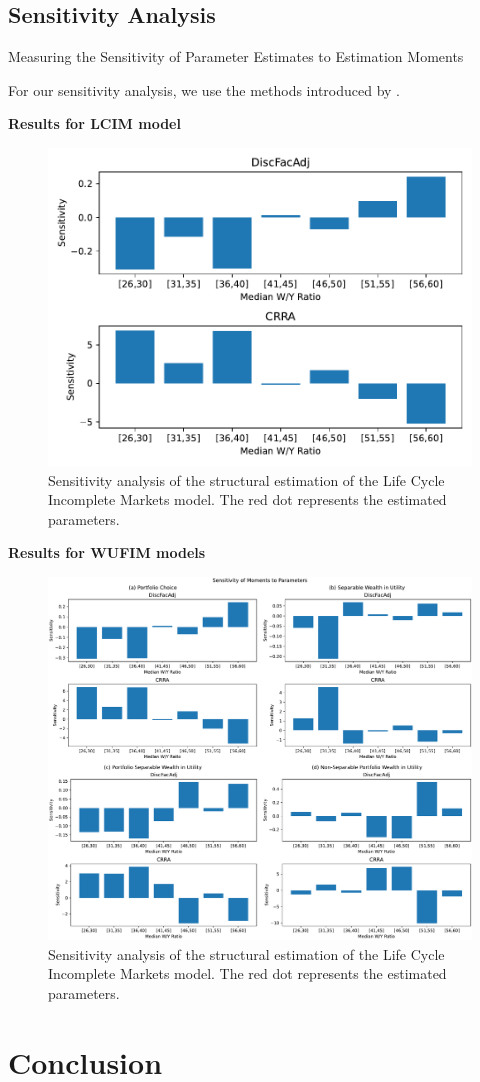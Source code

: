\documentclass{article}
\begin{document}
\subsection{Sensitivity Analysis}\label{Sensitivity Analysis}

\cite{Andrews_2017} Measuring the Sensitivity of Parameter Estimates to Estimation Moments

For our sensitivity analysis, we use the methods introduced by \cite{Andrews_2017}.

\textbf{Results for LCIM model}

\begin{figure}[!htbp]
\centering
\includegraphics[width=0.7\linewidth]{files/IndShockSensitivity-9046783d8c17a2fc3e39f5fb5ebcf6c7.pdf}
\caption{Sensitivity analysis of the structural estimation of the Life Cycle Incomplete Markets model. The red dot represents the estimated parameters.}
\label{fig:IndShockSensitivity}
\end{figure}

\textbf{Results for WUFIM models}

\begin{figure}[!htbp]
\centering
\includegraphics[width=0.7\linewidth]{files/AllSensitivity-0f14236654de527c752f26a13f644a4c.pdf}
\caption{Sensitivity analysis of the structural estimation of the Life Cycle Incomplete Markets model. The red dot represents the estimated parameters.}
\label{fig:AllSensitivity}
\end{figure}

\section{Conclusion}\label{Conclusion}





\end{document}
